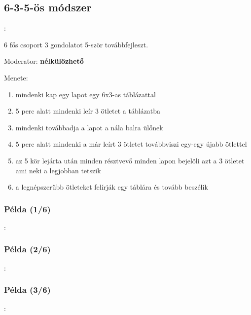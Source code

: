 \documentclass{beamer}
\begin{document}
\subsection{6-3-5-ös módszer}
\begin{frame}{\secname : \subsecname}

6 fős csoport 3 gondolatot 5-ször továbbfejleszt.

Moderator: \textbf{nélkülözhető}

Menete:
\begin{enumerate}
    \item mindenki kap egy lapot egy 6x3-as táblázattal
    \item 5 perc alatt mindenki leír 3 ötletet a táblázatba
    \item mindenki továbbadja a lapot a nála balra ülőnek
    \item 5 perc alatt mindenki a már leírt 3 ötletet továbbviszi egy-egy újabb ötlettel
    \item az 5 kör lejárta után minden résztvevő minden lapon bejelöli azt a 3 ötletet ami neki a legjobban tetszik
    \item a legnépszerűbb ötleteket felírják egy táblára és tovább beszélik
\end{enumerate}

\end{frame}

\subsubsection*{Példa (1/6)}
\begin{frame}{\subsecname : \subsubsecname}
    
\end{frame}

\subsubsection*{Példa (2/6)}
\begin{frame}{\subsecname : \subsubsecname}
    
\end{frame}

\subsubsection*{Példa (3/6)}
\begin{frame}{\subsecname : \subsubsecname}
    
\end{frame}
\end{document}
